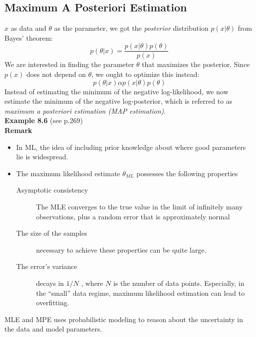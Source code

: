 \subsection{Maximum A Posteriori Estimation}
$x$ as data and $\theta$ as the parameter, we got the \textit{posterior} distribution $p(x|\theta)$ from Bayes' theorem:
\[
p(\theta | x) = \frac{p(x|\theta) p(\theta)}{p(x)} \tag{8.19}
\]
We are interested in finding the parameter $\theta$ that maximizes the posterior. Since $p(x)$ does not depend on $\theta$, we ought to optimize this instead: 
\[
p(\theta | x) \alpha p(x | \theta) p(\theta) \tag{8.20}
\]
Instead of estimating the minimum of the negative log-likelihood, we now estimate the minimum of the negative log-posterior, which is referred to as \textit{maximum a posteriori estimation (MAP estimation)}. \\
\textbf{Example 8.6} (see p.269) \\
\textbf{Remark}\\
\begin{itemize}
	\item In ML, the idea of including prior knowledge about where good parameters lie is widespread.
	\item The maximum likelihood estimate $\theta_{ML}$ possesses the following	properties
	\begin{description}
		\item[Asymptotic consistency] The MLE converges to the true value in the limit of infinitely many observations, plus a random error that is approximately normal
		\item[The size of the samples] necessary to achieve these properties can be quite large.
		\item[The error’s variance] decays in $1/N$ , where $N$ is the number of data points. Especially, in the “small” data regime, maximum likelihood estimation can lead to overfitting.
	\end{description}
\end{itemize}

MLE and MPE uses probabilistic modeling to reason about the uncertainty in the data and model parameters.

